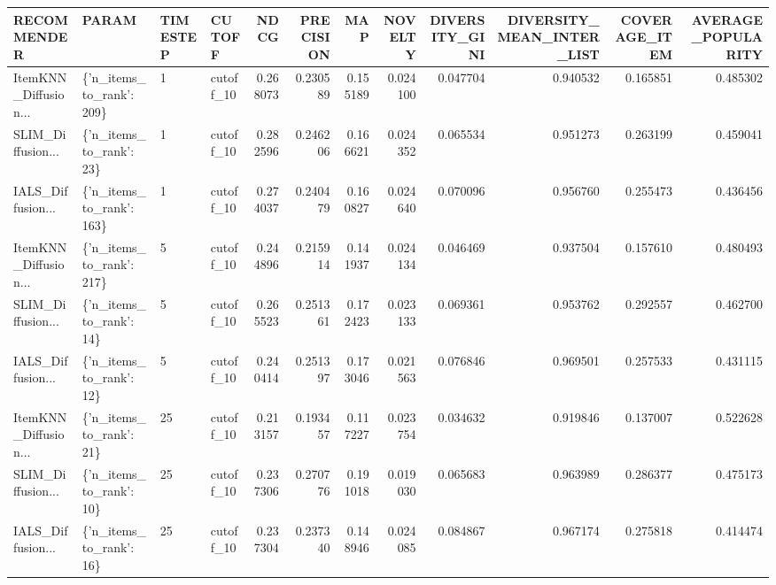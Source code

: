 \begin{tabular}{llllrrrrrrrr}
\toprule
                                       RECOMMENDER &                   PARAM & TIMESTEP &    CUTOFF &     NDCG &  PRECISION &      MAP &  NOVELTY &  DIVERSITY\_GINI &  DIVERSITY\_MEAN\_INTER\_LIST &  COVERAGE\_ITEM &  AVERAGE\_POPULARITY \\
\midrule
ItemKNN\_Diffusion... & \{'n\_items\_to\_rank': 209\} &        1 & cutoff\_10 & 0.268073 &   0.230589 & 0.155189 & 0.024100 &        0.047704 &                   0.940532 &       0.165851 &            0.485302 \\
SLIM\_Diffusion... &  \{'n\_items\_to\_rank': 23\} &        1 & cutoff\_10 & 0.282596 &   0.246206 & 0.166621 & 0.024352 &        0.065534 &                   0.951273 &       0.263199 &            0.459041 \\
IALS\_Diffusion... & \{'n\_items\_to\_rank': 163\} &        1 & cutoff\_10 & 0.274037 &   0.240479 & 0.160827 & 0.024640 &        0.070096 &                   0.956760 &       0.255473 &            0.436456 \\
ItemKNN\_Diffusion... & \{'n\_items\_to\_rank': 217\} &        5 & cutoff\_10 & 0.244896 &   0.215914 & 0.141937 & 0.024134 &        0.046469 &                   0.937504 &       0.157610 &            0.480493 \\
SLIM\_Diffusion... &  \{'n\_items\_to\_rank': 14\} &        5 & cutoff\_10 & 0.265523 &   0.251361 & 0.172423 & 0.023133 &        0.069361 &                   0.953762 &       0.292557 &            0.462700 \\
IALS\_Diffusion... &  \{'n\_items\_to\_rank': 12\} &        5 & cutoff\_10 & 0.240414 &   0.251397 & 0.173046 & 0.021563 &        0.076846 &                   0.969501 &       0.257533 &            0.431115 \\
ItemKNN\_Diffusion... &  \{'n\_items\_to\_rank': 21\} &       25 & cutoff\_10 & 0.213157 &   0.193457 & 0.117227 & 0.023754 &        0.034632 &                   0.919846 &       0.137007 &            0.522628 \\
SLIM\_Diffusion... &  \{'n\_items\_to\_rank': 10\} &       25 & cutoff\_10 & 0.237306 &   0.270776 & 0.191018 & 0.019030 &        0.065683 &                   0.963989 &       0.286377 &            0.475173 \\
IALS\_Diffusion... &  \{'n\_items\_to\_rank': 16\} &       25 & cutoff\_10 & 0.237304 &   0.237340 & 0.148946 & 0.024085 &        0.084867 &                   0.967174 &       0.275818 &            0.414474 \\

\end{tabular}
